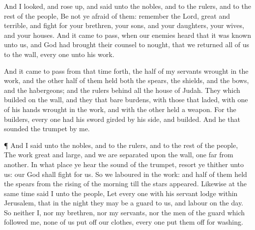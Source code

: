 {And I
looked, and rose
up, and
said unto the
nobles, and to the
rulers, and to the
rest of the
people, Be not ye
afraid of
them:
remember the
Lord,
{}
great and
terrible, and
fight for your
brethren, your
sons, and your
daughters, your
wives, and your
houses.
And it came to pass, when our
enemies
heard that it was
known unto us, and
God had
brought their
counsel to
nought, that we
returned all of us to the
wall, every
one unto his
work.
\par }{\PP {}And it came to pass from that
time forth,
{} the
half of my
servants
wrought in the
work, and the other
half of them
held both the
spears, the
shields, and the
bows, and the
habergeons; and the
rulers
{}
behind all the
house of
Judah.
They which
builded on the
wall, and they that
bare
burdens, with those that
laded,
{} with
one of his
hands
wrought in the
work, and with the
other
{}
held a
weapon.
For the
builders, every
one had his
sword
girded by his
side, and
{}
builded. And he that
sounded the
trumpet
{} by
me.
\par }{\PP {}¶ And I
said unto the
nobles, and to the
rulers, and to the
rest of the
people, The
work
{}
great and
large, and we are
separated upon the
wall,
one far
from
another.
In what
place
{} ye
hear the
sound of the
trumpet,
resort ye thither unto us: our
God shall
fight for us.
So we
laboured in the
work: and
half of them
held the
spears from the
rising of the
morning till the
stars
appeared.
Likewise at the same
time
said I unto the
people, Let every
one with his
servant
lodge
within
Jerusalem, that in the
night they may be a
guard to us, and
labour on the
day.
So neither I, nor my
brethren, nor my
servants, nor the
men of the
guard which
followed me, none of
us put
off our
clothes,
{} every
one put them
off for
washing.

}
